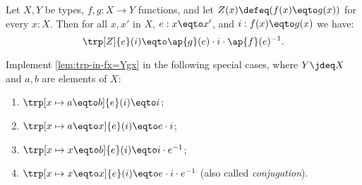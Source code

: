 \begin{construction}\label{lem:trp-in-fx=Ygx}
Let $X,Y$ be types, $f,g: X\to Y$ functions, and let
$Z(x)\defeq (f(x) \eqto g(x))$ for every $x:X$.
Then for all $x,x'$ in $X$, $e: x \eqto x'$, and $i: f(x) \eqto g(x)$ we have:
\[
\trp[Z]{ e} (i) \eqto \ap{g}(e) \cdot i \cdot \ap{f}(e)^{-1}.
\]
\end{construction}

\begin{xca}\label{xca:trp-in-a/x=b/x}
Implement \cref{lem:trp-in-fx=Ygx} in the following special cases,
where $Y\jdeq X$ and $a,b$ are elements of $X$:
\begin{enumerate}
\item $\trp[x\mapsto a \eqto b]{e} (i) \eqto i$;
\item\label{trp-in-a=x} $\trp[x\mapsto a \eqto x]{e} (i) \eqto e\cdot i$;
\item\label{trp-in-x=a} $\trp[x\mapsto x \eqto b]{e} (i) \eqto i \cdot e^{-1}$;
\item\label{trp-in-x=x} $\trp[x\mapsto x \eqto x]{e} (i) \eqto e \cdot i\cdot e^{-1}$
(also called \emph{conjugation}).\qedhere
\end{enumerate}
\end{xca}


